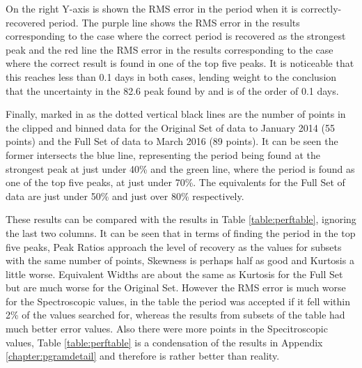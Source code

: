 On the right Y-axis is shown the RMS error in the period when it is correctly-recovered period. The purple line shows
the RMS error in the results corresponding to the case where the correct period is recovered as the strongest peak and
the red line the RMS error in the results corresponding to the case where the correct result is found in one of the top
five peaks. It is noticeable that this reaches less than 0.1 days in both cases, lending weight to the conclusion that
the uncertainty in the 82.6 peak found by {\asas} and {\hst} is of the order of 0.1 days.

Finally, marked in as the dotted vertical black lines are the number of points in the clipped and binned {\harps} data
for the Original Set of data to January 2014 (55 points) and the Full Set of data to March 2016 (89 points). It can be
seen the former intersects the blue line, representing the period being found at the strongest peak at just under 40\%
and the green line, where the period is found as one of the top five peaks, at just under 70\%. The equivalents for the
Full Set of data are just under 50\% and just over 80\% respectively.

These results can be compared with the results in Table \ref{table:perftable}, ignoring the last two columns. It can be
seen that in terms of finding the period in the top five peaks, Peak Ratios approach the level of recovery as the
{\asas} values for subsets with the same number of points, Skewness is perhaps half as good and Kurtosis a little
worse. Equivalent Widths are about the same as Kurtosis for the Full Set but are much worse for the Original
Set. However the RMS error is much worse for the Spectroscopic values, in the table the period was accepted if it fell
within 2\% of the values searched for, whereas the results from subsets of the {\asas} table had much better error
values. Also there were more points in the Specitroscopic values, Table \ref{table:perftable} is a condensation of the
results in Appendix \ref{chapter:pgramdetail} and therefore is rather better than reality.

